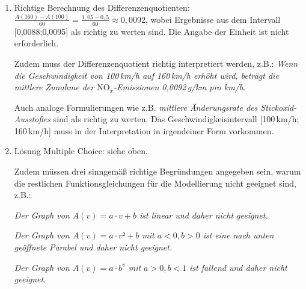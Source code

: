 \begin{langesbeispiel}
{\begin{enumerate}
PKW haben zwar einen Anteil von 76\,\% am Verkehrsaufkommen, sind aber nur für 35\,\% der $\text{NO}_x$-Emissionen verantwortlich. Durch eine Reduktion des Tempolimits von 130\,km/h auf 80\,km/h könnten laut Abbildung 1 maximal die Hälfte dieser Emissionen, also etwa 17\,\%, vermieden werden. Eine Verlagerung der Hälfte des LKW-Verkehrs auf die Schiene wäre daher die wirkungsvollere Maßnahme zur Reduktion der $\text{NO}_x$-Emissionen.

Anmerkung: Auch eine Begründung mit gerundeten relativen Anteilen (drei Viertel
 etc.) ist als richtig zu werten.
	
	\item Richtige Berechnung des Differenzenquotienten: $\frac{A(160)-A(100)}{60}=\frac{1,05-0,5}{60}\approx 0,0092$, wobei Ergebnisse aus dem Intervall [0,0088;0,0095] als richtig zu werten sind. Die Angabe der Einheit ist nicht erforderlich.
	
	Zudem muss der Differenzenquotient richtig interpretiert werden, z.B.: \textit{Wenn die Geschwindigkeit von 100\,km/h auf 160\,km/h erhöht wird, beträgt die mittlere Zunahme der $\text{NO}_x$-Emissionen 0,0092\,g/km pro km/h}.
	
	Auch analoge Formulierungen wie z.B. \textit{mittlere Änderungsrate des Stickoxid-Ausstoßes} sind als richtig zu werten. Das Geschwindigkeisintervall [100\,km/h; 160\,km/h] muss in der Interpretation in irgendeiner Form vorkommen.
	
	\item Lösung Multiple Choice: siehe oben.
	
	Zudem müssen drei sinngemäß richtige Begründungen angegeben sein, warum die restlichen Funktionsgleichungen für die Modellierung nicht geeignet sind, z.B.:
	
	\textit{Der Graph von $A(v)=a\cdot v+b$ ist linear und daher nicht geeignet.}
	
	\textit{Der Graph von $A(v)=a\cdot v²+b$ mit $a<0,b>0$ ist eine nach unten geöffnete Parabel und daher nicht geeignet.}
	
	\textit{Der Graph von $A(v)=a\cdot b^v$ mit $a>0,b<1$ ist fallend und daher nicht geeignet.}
	
		\end{enumerate}}
\end{langesbeispiel}